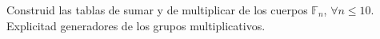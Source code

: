\question
Construid las tablas de sumar y de multiplicar de los cuerpos $\mathbb{F}_n$, $\forall n \leq 10$. Explicitad generadores de los grupos multiplicativos.